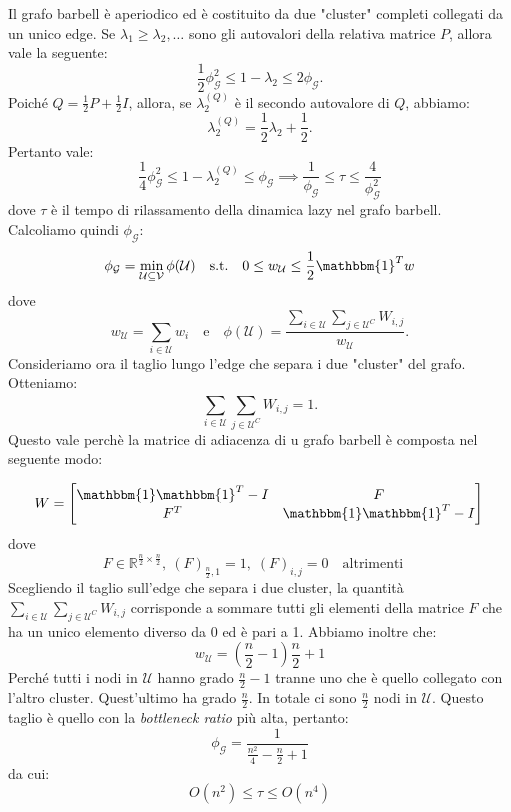 \begin{alphaparts}
    \questionpart
    Il grafo barbell è aperiodico ed è costituito da due "cluster" completi collegati da un unico edge. Se \(\lambda_1 \geq \lambda_2, \dots \) sono gli autovalori della relativa matrice \(P\), allora vale la seguente:
    \[\frac{1}{2} \phi_{\mathcal{G}}^2 \leq 1 - \lambda_2 \leq 2\phi_{\mathcal{G}}.\]
    Poiché \(Q = \frac{1}{2}P + \frac{1}{2}I\), allora, se \(\lambda_2^{(Q)}\) è il secondo autovalore di \(Q\), abbiamo:
    \[\lambda_2^{(Q)} = \frac{1}{2}\lambda_2 + \frac{1}{2}.\]
    Pertanto vale:
    \[\frac{1}{4} \phi_{\mathcal{G}}^2 \leq 1 - \lambda_2^{(Q)} \leq \phi_{\mathcal{G}} \implies \frac{1}{\phi_{\mathcal{G}}} \leq \tau \leq \frac{4}{\phi_{\mathcal{G}}^2}\]
    dove \(\tau\) è il tempo di rilassamento della dinamica lazy nel grafo barbell. Calcoliamo quindi \(\phi_{\mathcal{G}}\):
    \[\phi_{\mathcal{G}} = \min_{\mathcal{U}\subseteq \mathcal{V}}\phi(\mathcal{U})  \quad \text{s.t.} \quad 0 \leq w_{\mathcal{U}} \leq \frac{1}{2} \mathbbm{1}^Tw\]
    dove
    \[w_{\mathcal{U}} =  \sum \limits_{i \in \mathcal{U}}^{} w_i  \quad \text{e} \quad \phi(\mathcal{U}) = \frac{\sum \limits_{i\in \mathcal{U}}^{}  \sum \limits_{j \in \mathcal{U}^C}^{} W_{i,j}}{w_{\mathcal{U}}}.\]
    Consideriamo ora il taglio lungo l'edge che separa i due "cluster" del grafo. Otteniamo:
    \[\sum \limits_{i\in \mathcal{U}}^{}  \sum \limits_{j \in \mathcal{U}^C}^{} W_{i,j} = 1. \] 
    Questo vale perchè la matrice di adiacenza di u grafo barbell è composta nel seguente modo:
    
    \[W = \begin{bmatrix}
        \mathbbm{1}\mathbbm{1}^T - I & F \\
        F^T & \mathbbm{1}\mathbbm{1}^T - I
    \end{bmatrix}\,\] 
    dove
    \[F\in \mathbb{R}^{\frac{n}{2} \times \frac{n}{2}},\: (F)_{\frac{n}{2},1} = 1,\; (F)_{i,j} = 0  \quad \text{altrimenti} \quad\]
    Scegliendo il taglio sull'edge che separa i due cluster, la quantità \(\sum \limits_{i\in \mathcal{U}}^{}  \sum \limits_{j \in \mathcal{U}^C}^{} W_{i,j}\) corrisponde a sommare tutti gli elementi della matrice \(F\) che ha un unico elemento diverso da 0 ed è pari a 1.
    Abbiamo inoltre che:    
    \[w_{\mathcal{U}} = \left(\frac{n}{2}-1\right) \frac{n}{2} + 1\]
    Perché tutti i nodi in \(\mathcal{U}\) hanno grado 
    \(\frac{n}{2} - 1\) tranne uno che è quello collegato con l'altro cluster. Quest'ultimo ha grado \(\frac{n}{2}\). In totale ci sono \(\frac{n}{2}\) nodi in \(\mathcal{U}\). Questo taglio è quello con la \textit{bottleneck ratio} più alta, pertanto:
    \[\phi_{\mathcal{G}} = \frac{1}{\frac{n^2}{4} - \frac{n}{2} + 1}\]
    da cui:
    \[O(n^2) \leq \tau \leq O(n^4)\]


\end{alphaparts}
